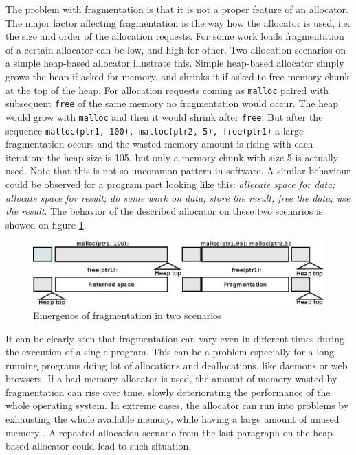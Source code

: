 The problem with fragmentation is that it is not a proper feature of an allocator. The major factor affecting fragmentation is the way how the allocator is used, i.e. the size and order of the allocation requests. For some work loads fragmentation of a certain allocator can be low, and high for other. Two allocation scenarios on a simple heap-based allocator illustrate this. Simple heap-based allocator simply grows the heap if asked for memory, and shrinks it if asked to free memory chunk at the top of the heap. For allocation requests coming as {\tt malloc} paired with subsequent {\tt free} of the same memory no fragmentation would occur. The heap would grow with {\tt malloc} and then it would shrink after {\tt free}. But after the sequence {\tt malloc(ptr1, 100), malloc(ptr2, 5), free(ptr1)} a large fragmentation occurs and the wasted memory amount is rising with each iteration: the heap size is 105, but only a memory chunk with size 5 is actually used. Note that this is not so uncommon pattern in software. A similar behaviour could be observed for a program part looking like this: {\em allocate space for data; allocate space for result; do some work on data; store the result; free the data; use the result}. The behavior of the described allocator on these two scenarios is showed on figure \ref{fig:fragmentation}.

\begin{figure}[h]
\begin{center}
\includegraphics[keepaspectratio,width=1.0\textwidth]{fig/fragmentation}
\end{center}
\caption{Emergence of fragmentation in two scenarios}
\label{fig:fragmentation}
\end{figure}

It can be clearly seen that fragmentation can vary even in different times during the execution of a single program. This can be a problem especially for a long running programs doing lot of allocations and deallocations, like daemons or web browsers. If a bad memory allocator is used, the amount of memory wasted by fragmentation can rise over time, slowly deteriorating the performance of the whole operating system. In extreme cases, the allocator can run into problems by exhausting the whole available memory, while having a large amount of unused memory \cite{DSAsurvey}. A repeated allocation scenario from the last paragraph on the heap-based allocator could lead to such situation.


